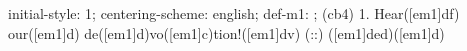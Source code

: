 initial-style: 1;
centering-scheme: english;
def-m1: \grealign;
(cb4) 1. Hear([em1]df) our([em1]d) de([em1]d)vo([em1]c)tion!([em1]dv) (::) ([em1]ded)([em1]d)